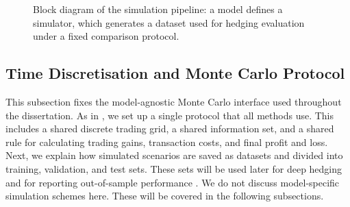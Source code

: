 \documentclass[12pt,a4paper]{article}
\theoremstyle{definition}
\theoremstyle{plain}
\theoremstyle{remark}
\theoremstyle{plain}
\begin{document}
\begin{figure}[H]
\centering
{}
\caption{Block diagram of the simulation pipeline: a model defines a simulator, which generates a dataset used for hedging evaluation under a fixed comparison protocol.}
\label{fig:sim_pipeline_block}
\end{figure}

\subsection{Time Discretisation and Monte Carlo Protocol}
\label{subsec:mc_protocol}

This subsection fixes the model-agnostic Monte Carlo interface used throughout the dissertation. 
As in \cite{Buehler2019DeepHedging}, we set up a single protocol that all methods use. This includes a shared discrete trading grid, a shared information set, and a shared rule for calculating trading gains, transaction costs, and final profit and loss.
Next, we explain how simulated scenarios are saved as datasets and divided into training, validation, and test sets. These sets will be used later for deep hedging and for reporting out-of-sample performance \cite{Buehler2019DeepHedging,Horvath2021DeepRough}.
We do not discuss model-specific simulation schemes here. These will be covered in the following subsections.
\end{document}
